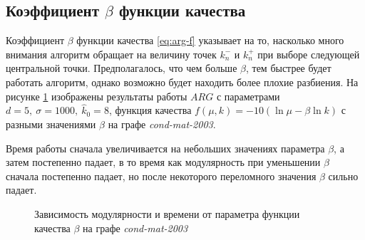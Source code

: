 
\subsection{Коэффициент $\beta$ функции качества}

Коэффициент $\beta$ функции качества \eqref{eq:arg-f} указывает на то, насколько много внимания алгоритм обращает на величину точек $k^{-}_n$ и $k^{+}_n$ при выборе следующей центральной точки. Предполагалось, что чем больше $\beta$, тем быстрее будет работать алгоритм, однако возможно будет находить более плохие разбиения. На рисунке \ref{fig:arg-beta} изображены результаты работы $ARG$ с параметрами $d = 5,\ \sigma = 1000,\ \hat{k}_0 = 8$, функция качества $f(\mu, k) = -10(\ln \mu - \beta \ln k)$ с разными значениями $\beta$ на графе \emph{cond-mat-2003}.

Время работы сначала увеличивается на небольших значениях параметра $\beta$, а затем постепенно падает, в то время как модулярность при уменьшении $\beta$ сначала постепенно падает, но после некоторого переломного значения $\beta$ сильно падает.

\begin{figure}[H]
	\caption{Зависимость модулярности и времени от параметра функции качества $\beta$ на графе \emph{cond-mat-2003}}
	\label{fig:arg-beta}
\end{figure}



